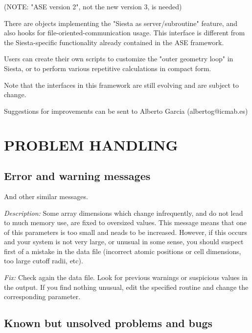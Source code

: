 \documentclass[11pt]{article}
\begin{document}
(NOTE: "ASE version 2", not the new version 3, is needed)

There are objects implementing the "Siesta as server/subroutine" feature, and
also hooks for file-oriented-communication usage. This interface is
different from the {\sc Siesta}-specific functionality already
contained in the ASE framework.

Users can create their own scripts to customize the "outer geometry loop"
in Siesta, or to perform various repetitive calculations in compact form.

Note that the interfaces in this framework are still evolving and are
subject to change.

Suggestions for improvements can be sent to Alberto Garcia
(albertog@icmab.es)

\section{PROBLEM HANDLING}

\subsection{Error and warning messages}

\begin{description}
\itemsep 10pt
\parsep 0pt

\item[{\tt chkdim: ERROR: In {\it routine} dimension {\it parameter} =
{\it value}. It must be  ...}]

And other similar messages.

{\it Description:} Some array dimensions which change infrequently,
and do not lead to much memory use, are fixed to oversized
values. This message means that one of this parameters is too small
and neads to be increased.  However, if this occurs and your system is
not very large, or unusual in some sense, you should suspect first of
a mistake in the data file (incorrect atomic positions or cell
dimensions, too large cutoff radii, etc).

{\it Fix:} Check again the data file.  Look for previous warnings or
suspicious values in the output.  If you find nothing unusual, edit
the specified routine and change the corresponding parameter.  

\end{description}



\subsection{Known but unsolved problems and bugs}
\end{document}
